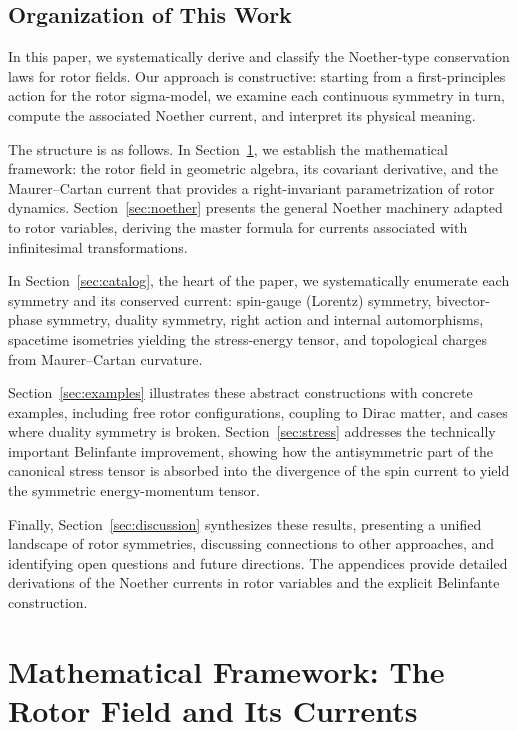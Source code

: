 \documentclass[11pt,a4paper]{article}
\numberwithin{equation}{section}
\theoremstyle{plain}
\theoremstyle{definition}
\theoremstyle{remark}
\begin{document}
\subsection{Organization of This Work}

In this paper, we systematically derive and classify the Noether-type conservation laws for rotor fields. Our approach is constructive: starting from a first-principles action for the rotor sigma-model, we examine each continuous symmetry in turn, compute the associated Noether current, and interpret its physical meaning.

The structure is as follows. In Section~\ref{sec:setup}, we establish the mathematical framework: the rotor field in geometric algebra, its covariant derivative, and the Maurer--Cartan current that provides a right-invariant parametrization of rotor dynamics. Section~\ref{sec:noether} presents the general Noether machinery adapted to rotor variables, deriving the master formula for currents associated with infinitesimal transformations.

In Section~\ref{sec:catalog}, the heart of the paper, we systematically enumerate each symmetry and its conserved current: spin-gauge (Lorentz) symmetry, bivector-phase symmetry, duality symmetry, right action and internal automorphisms, spacetime isometries yielding the stress-energy tensor, and topological charges from Maurer--Cartan curvature.

Section~\ref{sec:examples} illustrates these abstract constructions with concrete examples, including free rotor configurations, coupling to Dirac matter, and cases where duality symmetry is broken. Section~\ref{sec:stress} addresses the technically important Belinfante improvement, showing how the antisymmetric part of the canonical stress tensor is absorbed into the divergence of the spin current to yield the symmetric energy-momentum tensor.

Finally, Section~\ref{sec:discussion} synthesizes these results, presenting a unified landscape of rotor symmetries, discussing connections to other approaches, and identifying open questions and future directions. The appendices provide detailed derivations of the Noether currents in rotor variables and the explicit Belinfante construction.

\section{Mathematical Framework: The Rotor Field and Its Currents}
\label{sec:setup}
\end{document}
